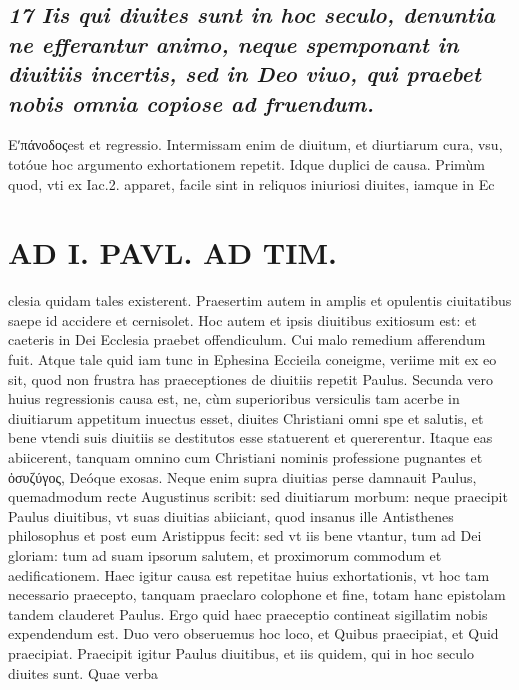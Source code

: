 \documentclass{article}
\begin{document}
\begin{pages}
\subsection*{\textit{17 Iis qui diuites sunt in hoc seculo, denuntia ne efferantur animo, neque spemponant in diuitiis incertis, sed in Deo viuo, qui praebet nobis omnia copiose ad fruendum. }}\pstart Εʹπάνοδοςest et regressio. Intermissam enim de diuitum, et diurtiarum cura, vsu, totóue hoc argumento exhortationem repetit. Idque duplici de causa. Primùm quod, vti ex Iac.2. apparet, facile sint in reliquos iniuriosi diuites, iamque in Ec\pend
\section*{AD I. PAVL. AD TIM. }
\marginpar{[ p.494 ]}\pstart clesia quidam tales existerent. Praesertim autem in amplis et opulentis ciuitatibus saepe id accidere et cernisolet. Hoc autem et ipsis diuitibus exitiosum est: et caeteris in Dei Ecclesia praebet offendiculum. Cui malo remedium afferendum fuit. Atque tale quid iam tunc in Ephesina Eccieila coneigme, veriime mit ex eo sit, quod non frustra has praeceptiones de diuitiis repetit Paulus.  \pend\pstart Secunda vero huius regressionis causa est, ne, cùm superioribus versiculis tam acerbe in diuitiarum appetitum inuectus esset, diuites Christiani omni spe et salutis, et bene vtendi suis diuitiis se destitutos esse statuerent et quererentur. Itaque eas abiicerent, tanquam omnino cum Christiani nominis professione pugnantes et ὀσυζύγος, Deóque exosas. Neque enim supra diuitias perse damnauit Paulus, quemadmodum recte Augustinus scribit: sed diuitiarum morbum: neque praecipit Paulus diuitibus, vt suas diuitias abiiciant, quod insanus ille Antisthenes philosophus et post eum Aristippus fecit: sed vt iis bene vtantur, tum ad Dei gloriam: tum ad suam ipsorum salutem, et proximorum commodum et aedificationem. Haec igitur causa est repetitae huius exhortationis, vt hoc tam necessario praecepto, tanquam praeclaro colophone et fine, totam hanc epistolam tandem clauderet Paulus.  \pend\pstart Ergo quid haec praeceptio contineat sigillatim nobis expendendum est. Duo vero obseruemus hoc loco, et Quibus praecipiat, et Quid praecipiat. Praecipit igitur Paulus diuitibus, et iis quidem, qui in hoc seculo diuites sunt. Quae verba  \pend

\end{pages}
\end{document}
